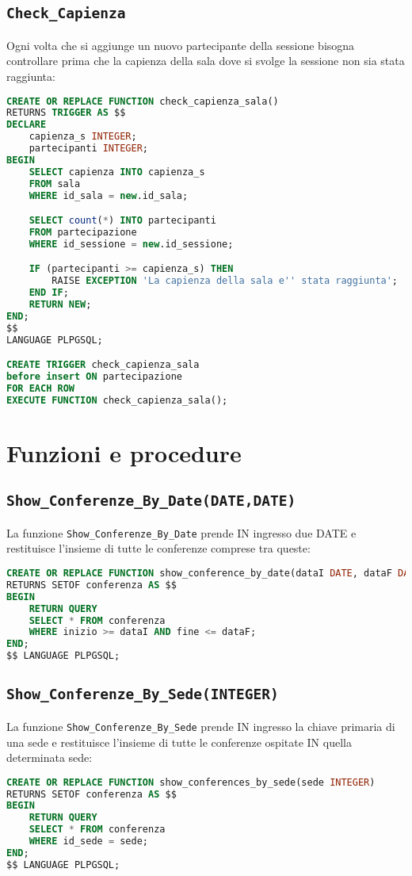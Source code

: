 \subsection{\texttt{Check\_Capienza}}
Ogni volta che si aggiunge un nuovo partecipante della sessione bisogna controllare prima che la capienza della sala dove si svolge la sessione non sia stata raggiunta:
\begin{lstlisting}[language=SQL, style=mystyle]
CREATE OR REPLACE FUNCTION check_capienza_sala() 
RETURNS TRIGGER AS $$
DECLARE
	capienza_s INTEGER;
	partecipanti INTEGER;
BEGIN
	SELECT capienza INTO capienza_s
	FROM sala
	WHERE id_sala = new.id_sala;

	SELECT count(*) INTO partecipanti
	FROM partecipazione
	WHERE id_sessione = new.id_sessione;

	IF (partecipanti >= capienza_s) THEN
		RAISE EXCEPTION 'La capienza della sala e'' stata raggiunta';
	END IF;
	RETURN NEW;
END;
$$ 
LANGUAGE PLPGSQL;

CREATE TRIGGER check_capienza_sala
before insert ON partecipazione
FOR EACH ROW
EXECUTE FUNCTION check_capienza_sala();
\end{lstlisting}
\section{Funzioni e procedure}
\subsection{\texttt{Show\_Conferenze\_By\_Date(DATE,DATE)}}
La funzione \texttt{Show\_Conferenze\_By\_Date} prende IN ingresso due DATE e restituisce l'insieme di tutte le conferenze comprese tra queste:
\begin{lstlisting}[language=SQL, style=mystyle]
CREATE OR REPLACE FUNCTION show_conference_by_date(dataI DATE, dataF DATE)
RETURNS SETOF conferenza AS $$
BEGIN
	RETURN QUERY
	SELECT * FROM conferenza
	WHERE inizio >= dataI AND fine <= dataF;
END;
$$ LANGUAGE PLPGSQL;
\end{lstlisting}
\subsection{\texttt{Show\_Conferenze\_By\_Sede(INTEGER)}}
La funzione \texttt{Show\_Conferenze\_By\_Sede} prende IN ingresso la chiave primaria di una sede e restituisce l'insieme di tutte le conferenze ospitate IN quella determinata sede:
\begin{lstlisting}[language=SQL, style=mystyle]
CREATE OR REPLACE FUNCTION show_conferences_by_sede(sede INTEGER)
RETURNS SETOF conferenza AS $$
BEGIN
	RETURN QUERY
	SELECT * FROM conferenza
	WHERE id_sede = sede;
END;
$$ LANGUAGE PLPGSQL;
\end{lstlisting}
